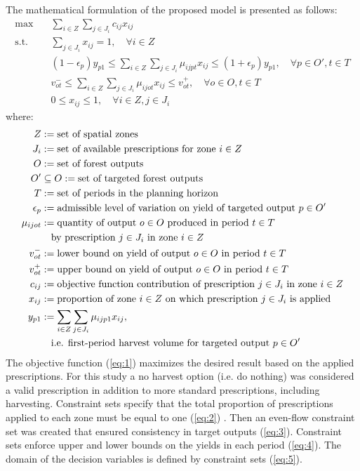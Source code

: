 \documentclass[preprint,12pt,authoryear]{elsarticle}
\begin{document}
\begin{linenumbers}
The mathematical formulation of the proposed model is presented as follows:
\begin{align}
\text{max} & \quad \sum_{i \in Z} \sum_{j \in J_i} c_{ij} x_{ij} \label{eq:1} \\
\text{s.t.} & \quad \sum_{j \in J_i} x_{ij} = 1, \quad \forall i \in Z \label{eq:2} \\
& \quad (1 - \epsilon_p) y_{p1} \leq \sum_{i \in Z} \sum_{j \in J_i} \mu_{ijpt} x_{ij} \leq (1 + \epsilon_p) y_{p1}, \quad \forall p \in O', t \in T \label{eq:3} \\
& \quad v_{ot}^- \leq \sum_{i \in Z} \sum_{j \in J_i} \mu_{ijot} x_{ij} \leq v_{ot}^+, \quad \forall o \in O, t \in T \label{eq:4} \\
& \quad 0 \leq x_{ij} \leq 1, \quad \forall i \in Z, j \in J_i \label{eq:5}
\end{align}
where:
\begin{align*}
Z &:= \text{set of spatial zones} \\
J_i &:= \text{set of available prescriptions for zone } i \in Z \\
O &:= \text{set of forest outputs} \\
O' &\subseteq O := \text{set of targeted forest outputs} \\
T &:= \text{set of periods in the planning horizon} \\
\epsilon_p &:= \text{admissible level of variation on yield of targeted output } p \in O' \\
\mu_{ijot} &:= \text{quantity of output } o \in O \text{ produced in period } t \in T \notag \\
           &\quad \text{by prescription } j \in J_i \text{ in zone } i \in Z \\
v_{ot}^- &:= \text{lower bound on yield of output } o \in O \text{ in period } t \in T \\
v_{ot}^+ &:= \text{upper bound on yield of output } o \in O \text{ in period } t \in T \\
c_{ij} &:= \text{objective function contribution of prescription } j \in J_i \text{ in zone } i \in Z \\
x_{ij} &:= \text{proportion of zone } i \in Z \text{ on which prescription } j \in J_i \text{ is applied} \\
y_{p1} &:= \sum_{i \in Z} \sum_{j \in J_i} \mu_{ijp1} x_{ij}, \notag \\
       &\quad \text{i.e. first-period harvest volume for targeted output } p \in O'
\end{align*}
The objective function (\ref{eq:1}) maximizes the desired result based on the applied prescriptions. For this study a no harvest option (i.e. do nothing) was considered a valid prescription  in addition to more standard prescriptions, including harvesting.  Constraint sets specify that the total proportion of prescriptions applied to each zone must be equal to one  (\ref{eq:2}) . Then an even-flow constraint set was created that ensured consistency in target outputs (\ref{eq:3}).  Constraint sets  enforce upper and lower bounds on the yields in each period (\ref{eq:4}). The domain of the decision variables is defined by constraint sets (\ref{eq:5}).


\end{linenumbers}
\end{document}
